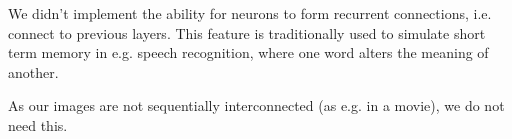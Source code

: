 We didn't implement the ability for neurons to form recurrent connections, i.e. connect to previous layers. This feature is traditionally used to simulate short term memory in e.g. speech recognition, where one word alters the meaning of another. \cite{HasimSak2014}  

As our images are not sequentially interconnected (as e.g. in a movie), we do not need this.

